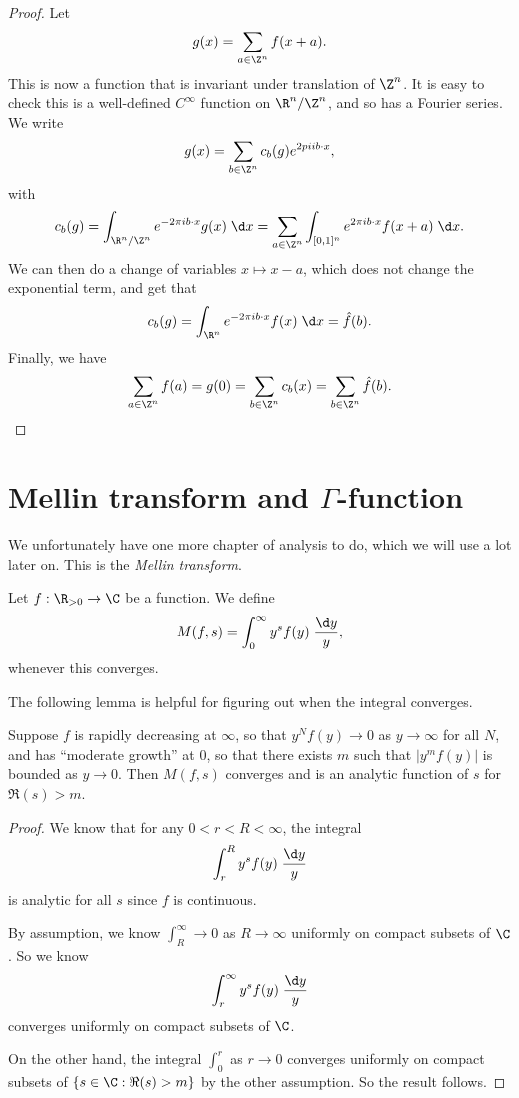\documentclass[a4paper]{article}
\begin{document}
\begin{proof}
  Let
  \[
    g(x) = \sum_{a \in \Z^n} f(x + a).
  \]
  This is now a function that is invariant under translation of $\Z^n$. It is easy to check this is a well-defined $C^\infty$ function on $\R^n/\Z^n$, and so has a Fourier series. We write
  \[
    g(x) = \sum_{b \in \Z^n} c_b(g) e^{2pi i b \cdot x},
  \]
  with
  \[
    c_b(g) = \int_{\R^n/\Z^n} e^{-2\pi i b\cdot x} g(x) \;\d x = \sum_{a \in \Z^n} \int_{[0, 1]^n} e^{2\pi i b\cdot x} f(x + a) \;\d x.
  \]
  We can then do a change of variables $x \mapsto x - a$, which does not change the exponential term, and get that
  \[
    c_b(g) = \int_{\R^n} e^{-2\pi i b \cdot x} f(x) \;\d x = \hat{f}(b).
  \]
  Finally, we have
  \[
    \sum_{a \in \Z^n} f(a) = g(0) = \sum_{b \in \Z^n} c_b(x) = \sum_{b \in \Z^n} \hat{f}(b).
  \]
\end{proof}

\section{Mellin transform and \texorpdfstring{$\Gamma$}{Gamma}-function}
We unfortunately have one more chapter of analysis to do, which we will use a lot later on. This is the \emph{Mellin transform}.

\begin{defi}
  Let $f: \R_{>0} \to\C$ be a function. We define
  \[
    M(f, s) = \int_0^\infty y^s f(y) \;\frac{\d y}{y},
  \]
  whenever this converges.
\end{defi}

The following lemma is helpful for figuring out when the integral converges.
\begin{lemma}
  Suppose $f$ is rapidly decreasing at $\infty$, so that $y^N f(y) \to 0$ as $y \to \infty$ for all $N$, and has ``moderate growth'' at $0$, so that there exists $m$ such that $|y^m f(y)|$ is bounded as $y \to 0$. Then $M(f, s)$ converges and is an analytic function of $s$ for $\Re(s) > m$.
\end{lemma}

\begin{proof}
  We know that for any $0 < r < R < \infty$, the integral
  \[
    \int_r^R y^s f(y) \;\frac{\d y}{y}
  \]
  is analytic for all $s$ since $f$ is continuous.

  By assumption, we know $\int_R^\infty \to 0$ as $R \to \infty$ uniformly on compact subsets of $\C$. So we know
  \[
    \int_r^\infty y^s f(y) \;\frac{\d y}{y}
  \]
  converges uniformly on compact subsets of $\C$.

  On the other hand, the integral $\int_0^r$ as $r \to 0$ converges uniformly on compact subsets of $\{s \in \C: \Re(s) > m\}$ by the other assumption. So the result follows.
\end{proof}
\end{document}

